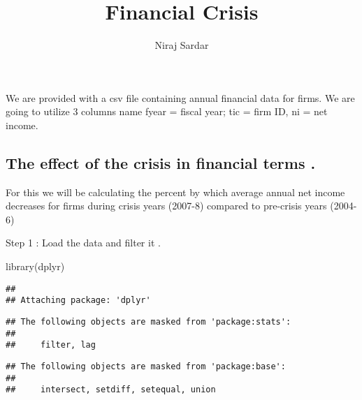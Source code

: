 \documentclass[
]{article}
\title{Financial Crisis}
\author{Niraj Sardar}
\date{}
\newenvironment{Shaded}{\begin{snugshade}}{\end{snugshade}}
\newcommand{\FunctionTok}[1]{\textcolor[rgb]{0.00,0.00,0.00}{#1}}
\newcommand{\NormalTok}[1]{#1}
\begin{document}
\maketitle

We are provided with a csv file containing annual financial data for
firms. We are going to utilize 3 columns name fyear = fiscal year; tic =
firm ID, ni = net income.

\hypertarget{the-effect-of-the-crisis-in-financial-terms-.}{%
\subsection{The effect of the crisis in financial terms
.}\label{the-effect-of-the-crisis-in-financial-terms-.}}

For this we will be calculating the percent by which average annual net
income decreases for firms during crisis years (2007-8) compared to
pre-crisis years (2004-6)

Step 1 : Load the data and filter it .

\begin{Shaded}
\begin{Highlighting}[]
\FunctionTok{library}\NormalTok{(dplyr)}
\end{Highlighting}
\end{Shaded}

\begin{verbatim}
## 
## Attaching package: 'dplyr'
\end{verbatim}

\begin{verbatim}
## The following objects are masked from 'package:stats':
## 
##     filter, lag
\end{verbatim}

\begin{verbatim}
## The following objects are masked from 'package:base':
## 
##     intersect, setdiff, setequal, union
\end{verbatim}
\end{document}
